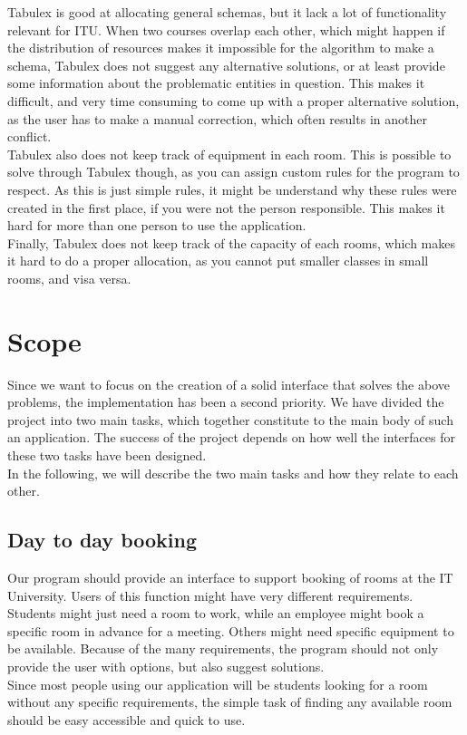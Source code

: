 Tabulex is good at allocating general schemas, but it lack a lot of functionality relevant for ITU. When two courses overlap each other, which might happen if the distribution of resources makes it impossible for the algorithm to make a schema, Tabulex does not suggest any alternative solutions, or at least provide some information about the problematic entities in question. This makes it difficult, and very time consuming to come up with a proper alternative solution, as the user has to make a manual correction, which often results in another conflict. \\
Tabulex also does not keep track of equipment in each room. This is possible to solve through Tabulex though, as you can assign custom rules for the program to respect. As this is just simple rules, it might be understand why these rules were created in the first place, if you were not the person responsible. This makes it hard for more than one person to use the application.\\
Finally, Tabulex does not keep track of the capacity of each rooms, which makes it hard to do a proper allocation, as you cannot put smaller classes in small rooms, and visa versa.

\label{sec:scope}
\section{Scope}
 Since we want to focus on the creation of a solid interface that solves the above problems, the implementation has been a second priority. We have divided the project into two main tasks, which together constitute to the main body of such an application. The success of the project depends on how well the interfaces for these two tasks have been designed.\\
In the following, we will describe the two main tasks and how they relate to each other.

\subsection{Day to day booking}
\label{chap1:day_to_day_booking}
Our program should provide an interface to support booking of rooms at the IT University. Users of this function might have very different requirements. Students might just need a room to work, while an employee might book a specific room in advance for a meeting. Others might need specific equipment to be available. Because of the many requirements, the program should not only provide the user with options, but also suggest solutions.\\
Since most people using our application will be students looking for a room without any specific requirements, the simple task of finding any available room should be easy accessible and quick to use. \\

